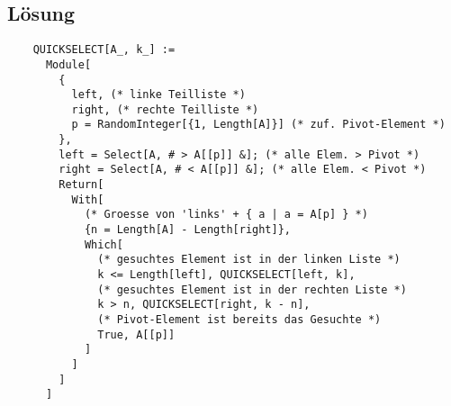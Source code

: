 \subsection*{Lösung}
  \begin{lstlisting}
    QUICKSELECT[A_, k_] :=
      Module[
        {
          left, (* linke Teilliste *)
          right, (* rechte Teilliste *)
          p = RandomInteger[{1, Length[A]}] (* zuf. Pivot-Element *)
        },
        left = Select[A, # > A[[p]] &]; (* alle Elem. > Pivot *)
        right = Select[A, # < A[[p]] &]; (* alle Elem. < Pivot *)
        Return[
          With[
            (* Groesse von 'links' + { a | a = A[p] } *)
            {n = Length[A] - Length[right]},
            Which[
              (* gesuchtes Element ist in der linken Liste *)
              k <= Length[left], QUICKSELECT[left, k],
              (* gesuchtes Element ist in der rechten Liste *)
              k > n, QUICKSELECT[right, k - n],
              (* Pivot-Element ist bereits das Gesuchte *)
              True, A[[p]]
            ]
          ]
        ]
      ]
  \end{lstlisting}

